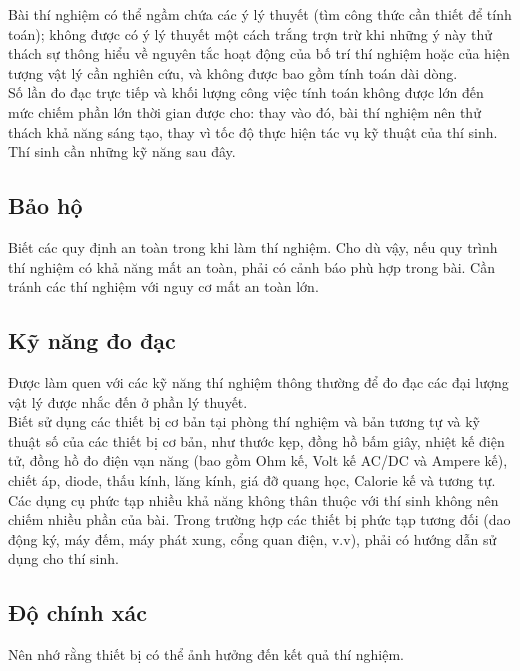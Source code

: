 \documentclass{article}
\begin{document}
\begin{multicols}{2}
Bài thí nghiệm có thể ngầm chứa các ý lý thuyết (tìm công thức cần thiết để tính toán); không được có ý lý thuyết một cách trắng trợn trừ khi những ý này thử thách sự thông hiểu về nguyên tắc hoạt động của bố trí thí nghiệm hoặc của hiện tượng vật lý cần nghiên cứu, và không được bao gồm tính toán dài dòng.\\

Số lần đo đạc trực tiếp và khối lượng công việc tính toán không được lớn đến mức chiếm phần lớn thời gian được cho: thay vào đó, bài thí nghiệm nên thử thách khả năng sáng tạo, thay vì tốc độ thực hiện tác vụ kỹ thuật của thí sinh.\\

Thí sinh cần những kỹ năng sau đây.\\

\subsection{Bảo hộ}
Biết các quy định an toàn trong khi làm thí nghiệm. Cho dù vậy, nếu quy trình thí nghiệm có khả năng mất an toàn, phải có cảnh báo phù hợp trong bài. Cần tránh các thí nghiệm với nguy cơ mất an toàn lớn.

\subsection{Kỹ năng đo đạc}
Được làm quen với các kỹ năng thí nghiệm thông thường để đo đạc các đại lượng vật lý được nhắc đến ở phần lý thuyết.\\

Biết sử dụng các thiết bị cơ bản tại phòng thí nghiệm và bản tương tự và kỹ thuật số của các thiết bị cơ bản, như thước kẹp, đồng hồ bấm giây, nhiệt kế điện tử, đồng hồ đo điện vạn năng (bao gồm Ohm kế, Volt kế AC/DC và Ampere kế), chiết áp, diode, thấu kính, lăng kính, giá đỡ quang học, Calorie kế và tương tự.\\

Các dụng cụ phức tạp nhiều khả năng không thân thuộc với thí sinh không nên chiếm nhiều phần của bài. Trong trường hợp các thiết bị phức tạp tương đối (dao động ký, máy đếm, máy phát xung, cổng quan điện, v.v), phải có hướng dẫn sử dụng cho thí sinh.\\

\subsection{Độ chính xác}
Nên nhớ rằng thiết bị có thể ảnh hưởng đến kết quả thí nghiệm.\\


\end{multicols}
\end{document}
